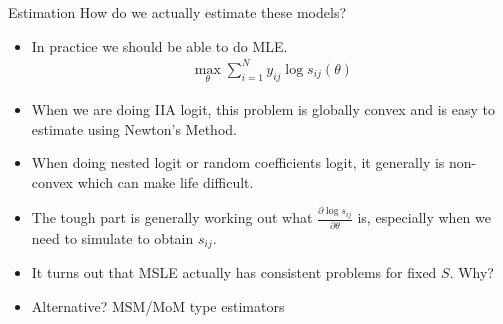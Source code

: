 \documentclass[xcolor=pdftex,dvipsnames,table,mathserif,aspectratio=169]{beamer}
\begin{document}
\begin{frame}{Estimation}
How do we actually estimate these models?
\begin{itemize}
\item In practice we should be able to do MLE.
\begin{eqnarray*}
\max_{\theta} \sum_{i=1}^N y_{ij} \log s_{ij}(\theta)
\end{eqnarray*}
\item When we are doing IIA logit, this problem is globally convex and is easy to estimate using Newton's Method.
\item When doing nested logit or random coefficients logit, it generally is non-convex which can make life difficult.
\item The tough part is generally working out what $\frac{\partial \log s_{ij}}{\partial \theta}$ is, especially when we need to simulate to obtain $s_{ij}$.
\item It turns out that MSLE actually has consistent problems for fixed $S$. Why?
\item Alternative? MSM/MoM type estimators
\end{itemize}
\end{frame}




\end{document}
